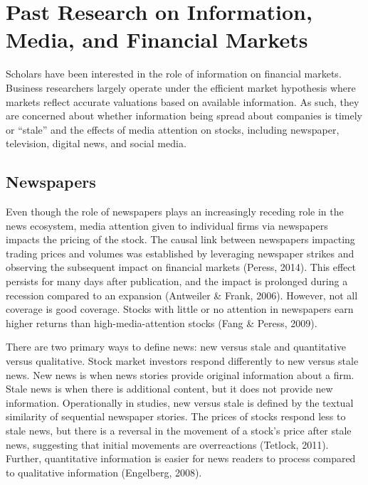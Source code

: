 \documentclass[12pt,]{article}
\begin{document}
\hypertarget{past-research-on-information-media-and-financial-markets}{%
\section{Past Research on Information, Media, and Financial
Markets}\label{past-research-on-information-media-and-financial-markets}}

Scholars have been interested in the role of information on financial
markets. Business researchers largely operate under the efficient market
hypothesis where markets reflect accurate valuations based on available
information. As such, they are concerned about whether information being
spread about companies is timely or ``stale'' and the effects of media
attention on stocks, including newspaper, television, digital news, and
social media.

\hypertarget{newspapers}{%
\subsection{Newspapers}\label{newspapers}}

Even though the role of newspapers plays an increasingly receding role
in the news ecosystem, media attention given to individual firms via
newspapers impacts the pricing of the stock. The causal link between
newspapers impacting trading prices and volumes was established by
leveraging newspaper strikes and observing the subsequent impact on
financial markets (Peress, 2014). This effect persists for many days
after publication, and the impact is prolonged during a recession
compared to an expansion (Antweiler \& Frank, 2006). However, not all
coverage is good coverage. Stocks with little or no attention in
newspapers earn higher returns than high-media-attention stocks (Fang \&
Peress, 2009).

There are two primary ways to define news: new versus stale and
quantitative versus qualitative. Stock market investors respond
differently to new versus stale news. New news is when news stories
provide original information about a firm. Stale news is when there is
additional content, but it does not provide new information.
Operationally in studies, new versus stale is defined by the textual
similarity of sequential newspaper stories. The prices of stocks respond
less to stale news, but there is a reversal in the movement of a stock's
price after stale news, suggesting that initial movements are
overreactions (Tetlock, 2011). Further, quantitative information is
easier for news readers to process compared to qualitative information
(Engelberg, 2008).
\end{document}
